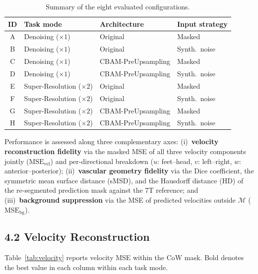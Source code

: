 \begin{table}[h!]
  \centering
  \caption{Summary of the eight evaluated configurations.}
  \label{tab:experiment_map}
  \small
  \begin{tabular}{clll}
    \toprule
    ID & Task mode & Architecture & Input strategy \\
    \midrule
    A & Denoising ($\times 1$) & Original           & Masked \\
    B & Denoising ($\times 1$) & Original           & Synth.\ noise \\
    C & Denoising ($\times 1$) & CBAM-PreUpsampling & Masked \\
    D & Denoising ($\times 1$) & CBAM-PreUpsampling & Synth.\ noise \\
    \midrule
    E & Super-Resolution ($\times 2$) & Original           & Masked \\
    F & Super-Resolution ($\times 2$) & Original           & Synth.\ noise \\
    G & Super-Resolution ($\times 2$) & CBAM-PreUpsampling & Masked \\
    H & Super-Resolution ($\times 2$) & CBAM-PreUpsampling & Synth.\ noise \\
    \bottomrule
  \end{tabular}
\end{table}

Performance is assessed along three complementary axes: (i)~\textbf{velocity reconstruction
fidelity} via the masked MSE of all three velocity components jointly ($\text{MSE}_\text{vel}$)
and per-directional breakdown ($u$: feet--head, $v$: left--right, $w$: anterior--posterior);
(ii)~\textbf{vascular geometry fidelity} via the Dice coefficient, the symmetric mean surface
distance (sMSD), and the Hausdorff distance (HD) of the re-segmented prediction mask against the
7T reference; and (iii)~\textbf{background suppression} via the MSE of predicted velocities
outside $\mathcal{M}$ ($\text{MSE}_\text{bg}$).

\subsection*{4.2 Velocity Reconstruction}

Table~\ref{tab:velocity} reports velocity MSE within the CoW mask.  Bold denotes the best value
in each column within each task mode.

